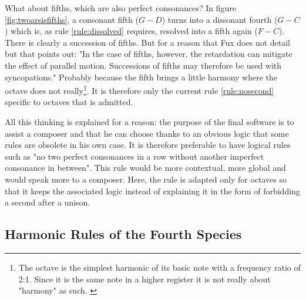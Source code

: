 \begin{enumerate}[wide, label=\bfseries 4.P\arabic*]
    What about fifths, which are also perfect consonances? In figure \ref{fig:twoarsisfifths}, a consonant fifth ($G-D$) turns into a dissonant fourth ($G-C$) which is, as rule \ref{rule:dissolved} requires, resolved into a fifth again ($F-C$). There is clearly a succession of fifths. But for a reason that Fux does not detail but that \textcite[p.57]{GaPEng} points out: "In the case of fifths, however, the retardation can mitigate the effect of parallel motion. Successions of fifths may therefore be used with syncopations." Probably because the fifth brings a little harmony where the octave does not really\footnote{The octave is the simplest harmonic of its basic note with a frequency ratio of 2:1. Since it is the same note in a higher register it is not really about "harmony" as such. \parencite{Octavei}}. It is therefore only the current rule \ref{rule:nosecond} specific to octaves that is admitted.

    All this thinking is explained for a reason: the purpose of the final software is to assist a composer and that he can choose thanks to an obvious logic that some rules are obsolete in his own case. It is therefore preferable to have logical rules such as "no two perfect consonances in a row without another imperfect consonance in between". This rule would be more contextual, more global and would speak more to a composer. Here, the rule is adapted only for octaves so that it keeps the associated logic instead of explaining it in the form of forbidding a second after a unison.
    
\end{enumerate}

\subsection{Harmonic Rules of the Fourth Species}

